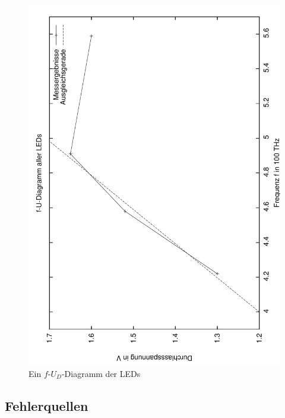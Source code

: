 \begin{figure}
   \centering
   \includegraphics[height=\textwidth,angle=-90]{praktika/mat_praktika/fu_plot01}
   \caption{Ein $f$-$U_D$-Diagramm der LEDs}
   \label{abb_fu}
\end{figure}



\subsection{Fehlerquellen}



